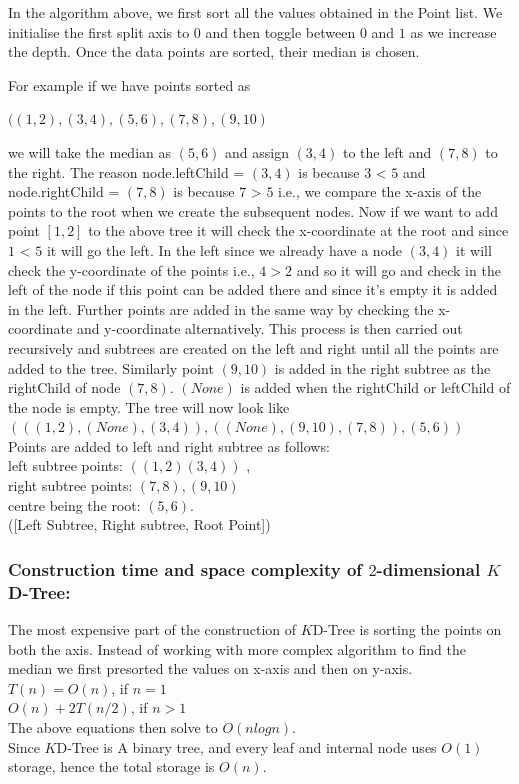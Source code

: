 In the algorithm above, we first sort all the values obtained in the Point list. We initialise the first split axis to $0$ and then toggle between $0$ and $1$ as we increase the depth. Once the data points are sorted, their median is chosen. 
\begin{mscexample}
    For example if we have points sorted as 

                $((1,2),(3,4),(5,6),(7,8),(9,10)$
    
    we will take the median as $(5,6)$ and assign $(3,4)$ to the left and $(7,8)$ to the right. The reason node.leftChild = $(3,4)$ is because $3$ < $5$ and node.rightChild = $(7,8)$ is because $7$ > $5$ i.e., we compare the x-axis of the points to the root when we create the subsequent nodes. Now if we want to add point $[1,2]$ to the above tree it will check the x-coordinate at the root and since $1$ < $5$ it will go the left. In the left since we already have a node $(3,4)$ it will check the y-coordinate of the points i.e., $4>2$ and so it will go and check in the left of the node if this point can be added there and since it's empty it is added in the left. Further points are added in the same way by checking the x-coordinate and y-coordinate alternatively. This process is then carried out recursively and subtrees are created on the left and right until all the points are added to the tree. Similarly point $(9,10)$ is added in the right subtree as the rightChild of
    node $(7,8)$. $(None)$ is added when the rightChild or leftChild of the node is empty. The tree will now look like\\

    $(((1,2),(None),(3,4)),((None),(9,10),(7,8)),(5,6))$\\

    Points are added to left and right subtree as follows:\\
    left subtree points: $((1,2)(3,4))$ ,\\
    right subtree points: $(7,8),(9,10)$ \\ 
    centre being the root: $(5,6)$. \\
    ([Left Subtree, Right subtree, Root Point])
\end{mscexample}
\subsubsection{Construction time and space complexity of $2$-dimensional $K$D-Tree:}

The most expensive part of the construction of $K$D-Tree is sorting the points on both the axis. Instead of working with more complex algorithm to find the median we first presorted the values on x-axis and then on y-axis.\\
$T(n) = O(n)$, if $n = 1$\\
$O(n) + 2T(n/2)$, if $n > 1$\\
The above equations then solve to $O( n log n)$.\\

Since $K$D-Tree is A binary tree, and every leaf and internal node uses $O(1)$ storage, hence the total storage is $O(n)$.


